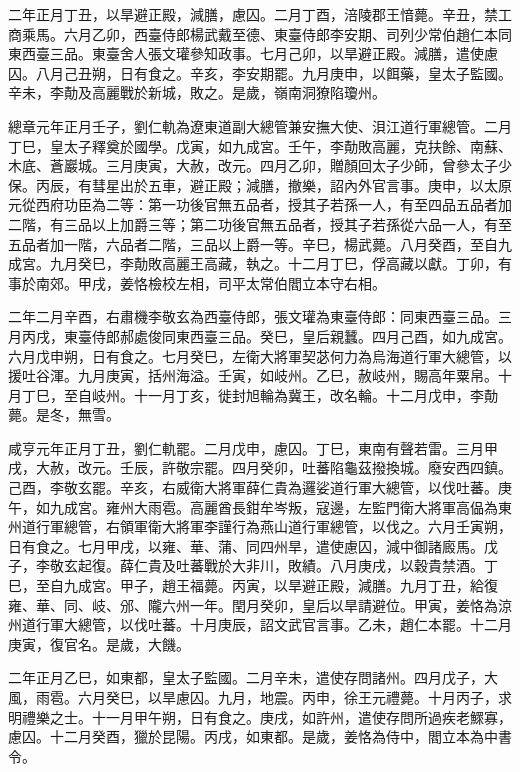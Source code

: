 \begin{pinyinscope}
 二年正月丁丑，以旱避正殿，減膳，慮囚。二月丁酉，涪陵郡王愔薨。辛丑，禁工商乘馬。六月乙卯，西臺侍郎楊武戴至德、東臺侍郎李安期、司列少常伯趙仁本同東西臺三品。東臺舍人張文瓘參知政事。七月己卯，以旱避正殿。減膳，遣使慮囚。八月己丑朔，日有食之。辛亥，李安期罷。九月庚申，以餌藥，皇太子監國。辛未，李勣及高麗戰於新城，敗之。是歲，嶺南洞獠陷瓊州。



 總章元年正月壬子，劉仁軌為遼東道副大總管兼安撫大使、浿江道行軍總管。二月丁巳，皇太子釋奠於國學。戊寅，如九成宮。壬午，李勣敗高麗，克扶餘、南蘇、木底、蒼巖城。三月庚寅，大赦，改元。四月乙卯，贈顏回太子少師，曾參太子少保。丙辰，有彗星出於五車，避正殿；減膳，撤樂，詔內外官言事。庚申，以太原元從西府功臣為二等：第一功後官無五品者，授其子若孫一人，有至四品五品者加二階，有三品以上加爵三等；第二功後官無五品者，授其子若孫從六品一人，有至五品者加一階，六品者二階，三品以上爵一等。辛巳，楊武薨。八月癸酉，至自九成宮。九月癸巳，李勣敗高麗王高藏，執之。十二月丁巳，俘高藏以獻。丁卯，有事於南郊。甲戌，姜恪檢校左相，司平太常伯閻立本守右相。



 二年二月辛酉，右肅機李敬玄為西臺侍郎，張文瓘為東臺侍郎：同東西臺三品。三月丙戌，東臺侍郎郝處俊同東西臺三品。癸巳，皇后親蠶。四月己酉，如九成宮。六月戊申朔，日有食之。七月癸巳，左衛大將軍契苾何力為烏海道行軍大總管，以援吐谷渾。九月庚寅，括州海溢。壬寅，如岐州。乙巳，赦岐州，賜高年粟帛。十月丁巳，至自岐州。十一月丁亥，徙封旭輪為冀王，改名輪。十二月戊申，李勣薨。是冬，無雪。



 咸亨元年正月丁丑，劉仁軌罷。二月戊申，慮囚。丁巳，東南有聲若雷。三月甲戌，大赦，改元。壬辰，許敬宗罷。四月癸卯，吐蕃陷龜茲撥換城。廢安西四鎮。己酉，李敬玄罷。辛亥，右威衛大將軍薛仁貴為邏娑道行軍大總管，以伐吐蕃。庚午，如九成宮。雍州大雨雹。高麗酋長鉗牟岑叛，寇邊，左監門衛大將軍高偘為東州道行軍總管，右領軍衛大將軍李謹行為燕山道行軍總管，以伐之。六月壬寅朔，日有食之。七月甲戌，以雍、華、蒲、同四州旱，遣使慮囚，減中御諸廄馬。戊子，李敬玄起復。薛仁貴及吐蕃戰於大非川，敗績。八月庚戌，以穀貴禁酒。丁巳，至自九成宮。甲子，趙王福薨。丙寅，以旱避正殿，減膳。九月丁丑，給復雍、華、同、岐、邠、隴六州一年。閏月癸卯，皇后以旱請避位。甲寅，姜恪為涼州道行軍大總管，以伐吐蕃。十月庚辰，詔文武官言事。乙未，趙仁本罷。十二月庚寅，復官名。是歲，大饑。



 二年正月乙巳，如東都，皇太子監國。二月辛未，遣使存問諸州。四月戊子，大風，雨雹。六月癸巳，以旱慮囚。九月，地震。丙申，徐王元禮薨。十月丙子，求明禮樂之士。十一月甲午朔，日有食之。庚戌，如許州，遣使存問所過疾老鰥寡，慮囚。十二月癸酉，獵於昆陽。丙戌，如東都。是歲，姜恪為侍中，閻立本為中書令。




\end{pinyinscope}
